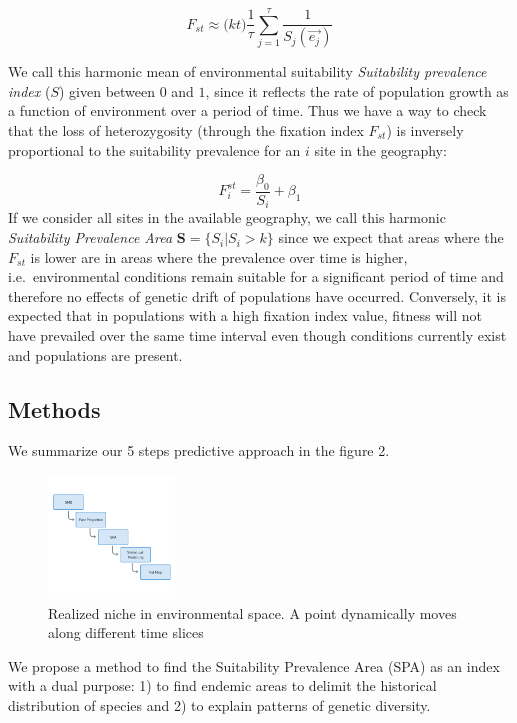 \documentclass[
]{article}
\begin{document}
\[
F_{st} \approx \Big (kt\Big)  \frac{1}{\tau}\sum_{j=1}^{\tau}\frac{1}{S_j(\vec{e_j})}
\]

We call this harmonic mean of environmental suitability
\emph{Suitability prevalence index }(\(S\)) given between \(0\) and
\(1\), since it reflects the rate of population growth as a function of
environment over a period of time. Thus we have a way to check that the
loss of heterozygosity (through the fixation index \(F_{st}\)) is
inversely proportional to the suitability prevalence for an \(i\) site
in the geography:

\[
F_{i}^{st}= \frac{\beta_0}{S_i} + \beta_1
\] If we consider all sites in the available geography, we call this
harmonic \emph{Suitability Prevalence Area}
\(\mathbf{S} = \{S_i | S_i > k\}\) since we expect that areas where the
\(F_{st}\) is lower are in areas where the prevalence over time is
higher, i.e.~environmental conditions remain suitable for a significant
period of time and therefore no effects of genetic drift of populations
have occurred. Conversely, it is expected that in populations with a
high fixation index value, fitness will not have prevailed over the same
time interval even though conditions currently exist and populations are
present.

\hypertarget{methods}{%
\subsection{Methods}\label{methods}}

We summarize our 5 steps predictive approach in the figure 2.

\begin{figure}
\centering
\includegraphics[width=0.3\textwidth,height=\textheight]{all_figures/figure_2.png}
\caption{Realized niche in environmental space. A point dynamically
moves along different time slices}
\end{figure}

We propose a method to find the Suitability Prevalence Area (SPA) as an
index with a dual purpose: 1) to find endemic areas to delimit the
historical distribution of species and 2) to explain patterns of genetic
diversity.
\end{document}
